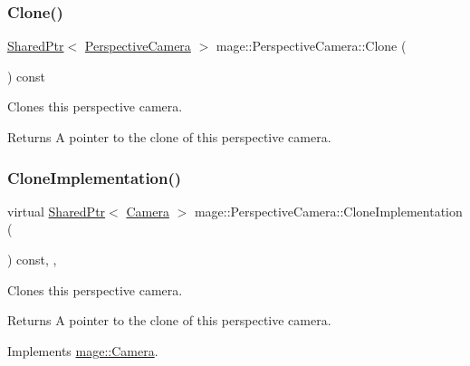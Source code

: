 \subsubsection{\texorpdfstring{Clone()}{Clone()}}
{\footnotesize\ttfamily \hyperlink{namespacemage_a1e01ae66713838a7a67d30e44c67703e}{Shared\+Ptr}$<$ \hyperlink{classmage_1_1_perspective_camera}{Perspective\+Camera} $>$ mage\+::\+Perspective\+Camera\+::\+Clone (\begin{DoxyParamCaption}{ }\end{DoxyParamCaption}) const}

Clones this perspective camera.

\begin{DoxyReturn}{Returns}
A pointer to the clone of this perspective camera. 
\end{DoxyReturn}
\hypertarget{classmage_1_1_perspective_camera_a247e65aa0ad584f8a1faeacd7196785a}{}\label{classmage_1_1_perspective_camera_a247e65aa0ad584f8a1faeacd7196785a} 
\subsubsection{\texorpdfstring{Clone\+Implementation()}{CloneImplementation()}}
{\footnotesize\ttfamily virtual \hyperlink{namespacemage_a1e01ae66713838a7a67d30e44c67703e}{Shared\+Ptr}$<$ \hyperlink{classmage_1_1_camera}{Camera} $>$ mage\+::\+Perspective\+Camera\+::\+Clone\+Implementation (\begin{DoxyParamCaption}{ }\end{DoxyParamCaption}) const\hspace{0.3cm}{\ttfamily [override]}, {\ttfamily [private]}, {\ttfamily [virtual]}}

Clones this perspective camera.

\begin{DoxyReturn}{Returns}
A pointer to the clone of this perspective camera. 
\end{DoxyReturn}


Implements \hyperlink{classmage_1_1_camera_a96c1bee3dc4085c8c7892427518165fc}{mage\+::\+Camera}.

\hypertarget{classmage_1_1_perspective_camera_ab74cbd2777d5b430da5702a12b1b451e}{}\label{classmage_1_1_perspective_camera_ab74cbd2777d5b430da5702a12b1b451e} 
